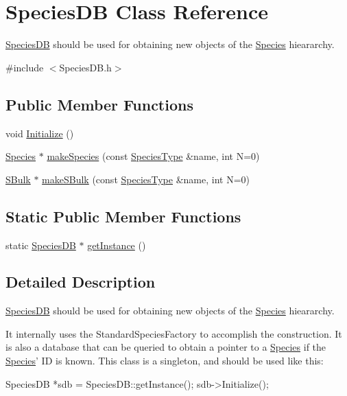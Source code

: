 \hypertarget{classSpeciesDB}{\section{Species\-D\-B Class Reference}
\label{classSpeciesDB}
}


\hyperlink{classSpeciesDB}{Species\-D\-B} should be used for obtaining new objects of the \hyperlink{classSpecies}{Species} hieararchy.  




{\ttfamily \#include $<$Species\-D\-B.\-h$>$}

\subsection*{Public Member Functions}
\begin{DoxyCompactItemize}
\item 
void \hyperlink{classSpeciesDB_a8c6c7e5c59cf237210b4f91c4235f165}{Initialize} ()
\item 
\hyperlink{classSpecies}{Species} $\ast$ \hyperlink{classSpeciesDB_ace46d47499b147c9cb17c18d06e8558a}{make\-Species} (const \hyperlink{Species_8h_af8f3afcc030f67a124aa4a6b5badf495}{Species\-Type} \&name, int N=0)
\item 
\hyperlink{classSBulk}{S\-Bulk} $\ast$ \hyperlink{classSpeciesDB_a0cb94a600f33c10032595e8fc008c969}{make\-S\-Bulk} (const \hyperlink{Species_8h_af8f3afcc030f67a124aa4a6b5badf495}{Species\-Type} \&name, int N=0)
\end{DoxyCompactItemize}
\subsection*{Static Public Member Functions}
\begin{DoxyCompactItemize}
\item 
static \hyperlink{classSpeciesDB}{Species\-D\-B} $\ast$ \hyperlink{classSpeciesDB_a8f3e30d93fd019bf0d0d0f657a81794f}{get\-Instance} ()
\end{DoxyCompactItemize}


\subsection{Detailed Description}
\hyperlink{classSpeciesDB}{Species\-D\-B} should be used for obtaining new objects of the \hyperlink{classSpecies}{Species} hieararchy. 

It internally uses the Standard\-Species\-Factory to accomplish the construction. It is also a database that can be queried to obtain a pointer to a \hyperlink{classSpecies}{Species} if the \hyperlink{classSpecies}{Species}' I\-D is known. This class is a singleton, and should be used like this\-: 
\begin{DoxyCode}
 SpeciesDB *sdb = SpeciesDB::getInstance();
 sdb->Initialize();
\end{DoxyCode}
 


